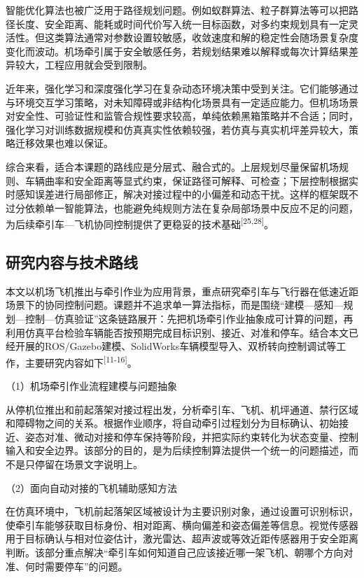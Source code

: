 \documentclass[UTF8,a4paper,12pt]{ctexart}
\begin{document}
智能优化算法也被广泛用于路径规划问题。例如蚁群算法、粒子群算法等可以把路径长度、安全距离、能耗或时间代价写入统一目标函数，对多约束规划具有一定灵活性。但这类算法通常对参数设置较敏感，收敛速度和解的稳定性会随场景复杂度变化而波动。机场牵引属于安全敏感任务，若规划结果难以解释或每次计算结果差异较大，工程应用就会受到限制。

近年来，强化学习和深度强化学习在复杂动态环境决策中受到关注。它们能够通过与环境交互学习策略，对未知障碍或非结构化场景具有一定适应能力。但机场场景对安全性、可验证性和监管合规性要求较高，单纯依赖黑箱策略并不合适；同时，强化学习对训练数据规模和仿真真实性依赖较强，若仿真与真实机坪差异较大，策略迁移效果也难以保证。

综合来看，适合本课题的路线应是分层式、融合式的。上层规划尽量保留机场规则、车辆曲率和安全距离等显式约束，保证路径可解释、可检查；下层控制根据实时感知误差进行局部修正，解决对接过程中的小偏差和动态干扰。这样的框架既不过分依赖单一智能算法，也能避免纯规则方法在复杂局部场景中反应不足的问题，为后续牵引车---飞机协同控制提供了更稳妥的技术基础\textsuperscript{[25,28]}。

\subsection{研究内容与技术路线}\label{_Toc229105293}

本文以机场飞机推出与牵引作业为应用背景，重点研究牵引车与飞行器在低速近距场景下的协同控制问题。课题并不追求单一算法指标，而是围绕``建模---感知---规划---控制---仿真验证''这条链路展开：先把机场牵引作业抽象成可计算的问题，再利用仿真平台检验车辆能否按预期完成目标识别、接近、对准和停车。结合本文已经开展的ROS/Gazebo建模、SolidWorks车辆模型导入、双桥转向控制调试等工作，主要研究内容如下\textsuperscript{[11-16]}。

（1）机场牵引作业流程建模与问题抽象

从停机位推出和前起落架对接过程出发，分析牵引车、飞机、机坪通道、禁行区域和障碍物之间的关系。根据作业顺序，将自动牵引过程划分为目标确认、初始接近、姿态对准、微动对接和停车保持等阶段，并把实际约束转化为状态变量、控制输入和安全边界。该部分的目的，是为后续控制算法提供一个统一的问题描述，而不是只停留在场景文字说明上。

（2）面向自动对接的飞机辅助感知方法

在仿真环境中，飞机前起落架区域被设计为主要识别对象，通过设置可识别标识，使牵引车能够获取目标身份、相对距离、横向偏差和姿态偏差等信息。视觉传感器用于目标确认与相对位姿估计，激光雷达、超声波或等效近距传感器用于安全距离判断。该部分重点解决``牵引车如何知道自己应该接近哪一架飞机、朝哪个方向对准、何时需要停车''的问题。
\end{document}
